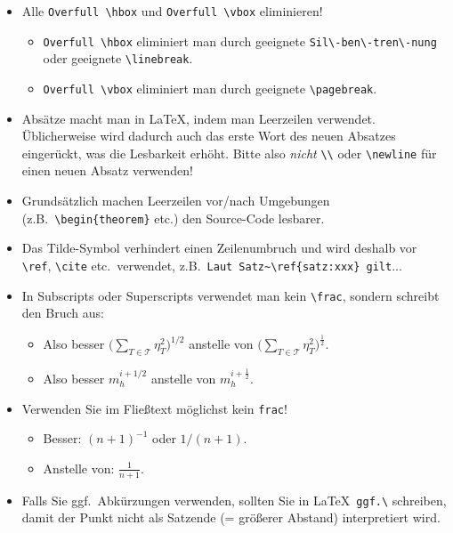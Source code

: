 \documentclass[a4paper,11pt,bibliography=totoc,listof=totoc,headinclude=true,cleardoublepage=empty,oneside]{scrbook}
\begin{document}
{\color{change}
\begin{itemize}

\item Alle \verb$Overfull \hbox$ und \verb$Overfull \vbox$ eliminieren!
\begin{itemize}
\item \verb$Overfull \hbox$ eliminiert man durch geeignete \verb$Sil\-ben\-tren\-nung$ oder geeignete \verb$\linebreak$.
\item \verb$Overfull \vbox$ eliminiert man durch geeignete \verb$\pagebreak$.
\end{itemize}

\item Absätze macht man in \LaTeX, indem man Leerzeilen verwendet. Üblicherweise wird dadurch auch das erste Wort des neuen Absatzes eingerückt, was die Lesbarkeit erhöht. Bitte also \emph{nicht} \verb$\\$ oder \verb$\newline$ für einen neuen Absatz verwenden! 
\item Grundsätzlich machen Leerzeilen vor/nach Umgebungen (z.B.\ \verb$\begin{theorem}$ etc.) den Source-Code lesbarer.
\item Das Tilde-Symbol verhindert einen Zeilenumbruch und wird deshalb vor \verb$\ref$, \verb$\cite$ etc.\ verwendet, z.B.\ \verb$Laut Satz~\ref{satz:xxx} gilt$...

\item In Subscripts oder Superscripts verwendet man kein \verb$\frac$, sondern schreibt den Bruch aus:
\begin{itemize}
\item Also besser $\displaystyle \bigg(\sum_{T \in \mathcal T} \eta_T^2\bigg)^{1/2}$ anstelle von
$\displaystyle \bigg(\sum_{T \in \mathcal T} \eta_T^2\bigg)^{\frac{1}{2}}$.
\item Also besser $m_h^{i+1/2}$ anstelle von $m_h^{i+\frac{1}{2}}$.
\end{itemize}

\item Verwenden Sie im Fließtext möglichst kein \verb$frac$!
\begin{itemize}
\item Besser: $(n+1)^{-1}$ oder $1/(n+1)$.
\item Anstelle von: $\frac{1}{n+1}$.
\end{itemize}

\item Falls Sie ggf.\ Abkürzungen verwenden, sollten Sie in \LaTeX\ \verb$ggf.\$ schreiben, damit der Punkt nicht als Satzende (= größerer Abstand) interpretiert wird.


\end{itemize}}
\end{document}
